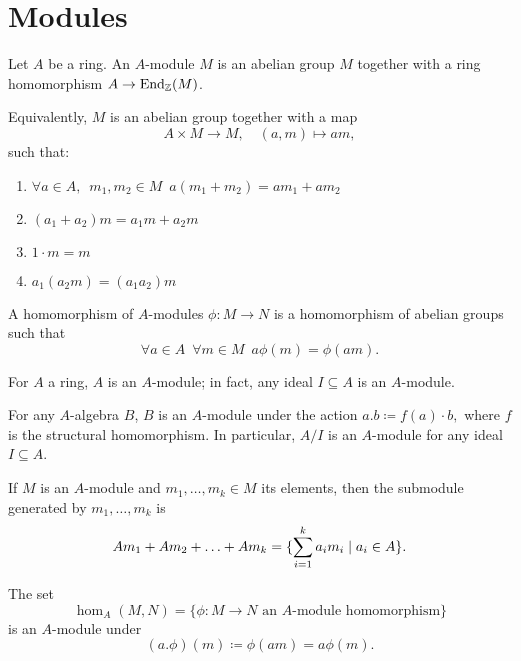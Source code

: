 \section{Modules}

\begin{df}
  Let $A$ be a ring. An $A$-module $M$ is an abelian group $M$ together with a ring homomorphism $A \to \operatorname*{End}_{\mathbb Z}(M)$.

Equivalently, $M$ is an abelian group together with a map
\[ A \times M \to M, \quad (a, m) \mapsto am, \]
such that:
\begin{enumerate}
\item $\forall a \in A, \enspace m_1, m_2 \in M \enspace a(m_1+m_2) = am_1 + am_2$
\item $(a_1 + a_2)m = a_1 m + a_2 m$
\item $1 \cdot m = m$
\item $a_1 (a_2 m) = (a_1 a_2) m$
\end{enumerate}
\end{df}

\begin{df}
  A homomorphism of $A$-modules $\phi \colon M \to N$ is a homomorphism of abelian groups such that
  \[ \forall a \in A \enspace \forall m \in M \enspace a \phi(m) = \phi(am). \]
\end{df}

\begin{example}
  For $A$ a ring, $A$ is an $A$-module; in fact, any ideal $I \subseteq A$ is an $A$-module.
\end{example}

\begin{example}
  For any $A$-algebra $B$, $B$ is an $A$-module under the action \(a.b \coloneqq f(a) \cdot b,\) where \(f\) is the structural homomorphism. In particular, $A/{I}$ is an $A$-module for any ideal $I \subseteq A$.
\end{example}

\begin{df}
  If $M$ is an $A$-module and $m_1, \ldots, m_k \in M$ its elements, then the submodule generated by $m_1, \ldots, m_k$ is
  \[ Am_1 + Am_2 + \ldots + Am_k = \{ \sum_{i=1}^k a_i m_i \mathrel{|} a_i \in A \}.\]
\end{df}

\begin{prop}
  The set
  \[ \hom_A(M, N) = \{ \phi: M \to N \text{ an $A$-module homomorphism} \} \]
  is an $A$-module under
  \[ (a.\phi)(m) \coloneqq \phi(am) = a \phi(m).\]
\end{prop}

